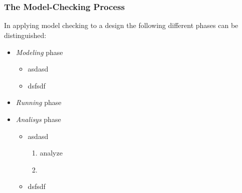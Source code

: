 \documentclass[a4paper,11pt]{article}
\begin{document}
 
\section*{}
\subsection*{}
\subsection*{}
\subsection*{}
\subsubsection{The Model-Checking Process}
\begin{flushleft}
	In applying model checking to a design the following different phases can be distinguished:
\end{flushleft}
\begin{itemize}
	\item \textit{Modeling} phase
	\begin{itemize}[label={--}]
		\item asdasd
		\item dsfsdf
	\end{itemize}
\item \textit{Running} phase
\item \textit{Analisys} phase
	\begin{itemize}[label={--}]
	\item asdasd
	\begin{enumerate}
		\item analyze
		\item
	\end{enumerate}
	\item dsfsdf
\end{itemize}
\end{itemize}

 

 
\end{document}
